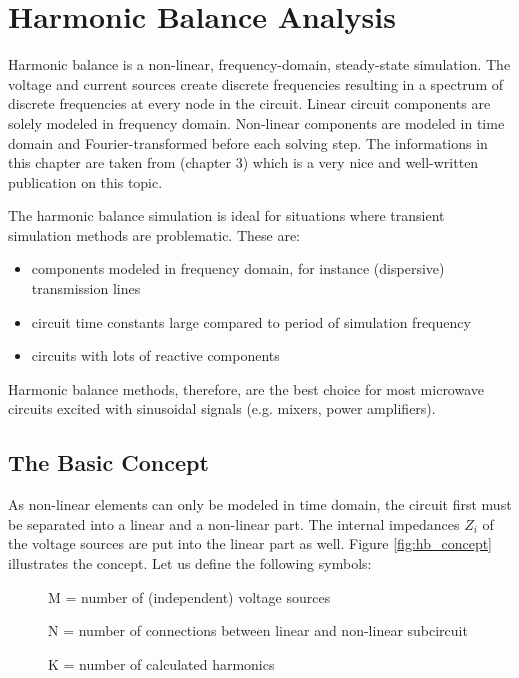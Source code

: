 %
%
%
%

\chapter{Harmonic Balance Analysis}
\label{sec:hb_analysis}

Harmonic balance is a non-linear, frequency-domain, steady-state
simulation.  The voltage and current sources create discrete
frequencies resulting in a spectrum of discrete frequencies at every
node in the circuit. Linear circuit components are solely modeled in
frequency domain. Non-linear components are modeled in time domain and
Fourier-transformed before each solving step.  The informations in
this chapter are taken from \cite{Maas1} (chapter 3) which is a very
nice and well-written publication on this topic.

\addvspace{12pt}

The harmonic balance simulation is ideal for situations where
transient simulation methods are problematic. These are:
\begin{itemize}
\item components modeled in frequency domain, for instance (dispersive)
      transmission lines
\item circuit time constants large compared to period of simulation
      frequency
\item circuits with lots of reactive components
\end{itemize}
Harmonic balance methods, therefore, are the best choice for most microwave
circuits excited with sinusoidal signals (e.g. mixers, power amplifiers).


\section{The Basic Concept}

As non-linear elements can only be modeled in time domain, the circuit
first must be separated into a linear and a non-linear part. The
internal impedances $Z_i$ of the voltage sources are put into the
linear part as well. Figure \ref{fig:hb_concept} illustrates the
concept. Let us define the following symbols:
\begin{description}
\item[] M = number of (independent) voltage sources
\item[] N = number of connections between linear and non-linear subcircuit
\item[] K = number of calculated harmonics
\end{description}

